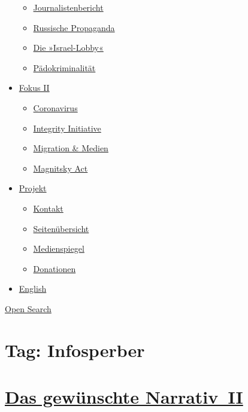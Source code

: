 \begin{itemize}
  \begin{itemize}
  \tightlist
  \item
    \href{https://swprs.org/bericht-eines-journalisten/}{Journalistenbericht}
  \item
    \href{https://swprs.org/russische-propaganda/}{Russische Propaganda}
  \item
    \href{https://swprs.org/die-israel-lobby-fakten-und-mythen/}{Die
    »Israel-Lobby«}
  \item
    \href{https://swprs.org/geopolitik-und-paedokriminalitaet/}{Pädokriminalität}
  \end{itemize}
\item
  \href{https://swprs.org/migration-und-medien/}{Fokus II}

  \begin{itemize}
  \tightlist
  \item
    \href{https://swprs.org/covid-19-hinweis-ii/}{Coronavirus}
  \item
    \href{https://swprs.org/die-integrity-initiative/}{Integrity
    Initiative}
  \item
    \href{https://swprs.org/migration-und-medien/}{Migration \& Medien}
  \item
    \href{https://swprs.org/der-fall-magnitsky/}{Magnitsky Act}
  \end{itemize}
\item
  \href{https://swprs.org/kontakt/}{Projekt}

  \begin{itemize}
  \tightlist
  \item
    \href{https://swprs.org/kontakt/}{Kontakt}
  \item
    \href{https://swprs.org/uebersicht/}{Seitenübersicht}
  \item
    \href{https://swprs.org/medienspiegel/}{Medienspiegel}
  \item
    \href{https://swprs.org/donationen/}{Donationen}
  \end{itemize}
\item
  \href{https://swprs.org/contact/}{English}
\end{itemize}

\protect\hyperlink{}{Open Search}

\hypertarget{tag-infosperber}{%
\section{Tag: Infosperber}\label{tag-infosperber}}

\hypertarget{das-gewuxfcnschte-narrativ-ii}{%
\section{\texorpdfstring{\href{https://swprs.org/2017/03/01/das-gewuenschte-narrativ-ii/}{Das
gewünschte
Narrativ~II}}{Das gewünschte Narrativ~II}}\label{das-gewuxfcnschte-narrativ-ii}}

